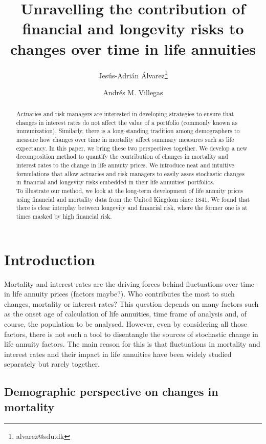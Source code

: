 \documentclass[12pt]{article}
\title{Unravelling the contribution of financial and longevity risks to changes over time in life annuities}
\author[1]{Jes\'us-Adri\'an \'Alvarez\thanks{alvarez@sdu.dk}}
\author[2]{Andr\'es M. Villegas}
\affil[1]{{\small Interdisciplinary Centre on Population Dynamics, University of Southern Denmark} }
\affil[2]{\small{School of Risk and Actuarial Studies and ARC Centre of Excellence in Population Ageing Research (CEPAR)\\ UNSW Business School, Sydney, Australia}}
\begin{document}
\maketitle

{
\setcounter{tocdepth}{2}
}



\begin{abstract}
	Actuaries and risk managers are interested in developing strategies to ensure that changes in interest rates do not affect the value of a portfolio (commonly known as immunization). Similarly, there is a long-standing tradition among demographers to measure how changes over time in mortality affect summary measures such as life expectancy. In this paper, we bring these two perspectives together. We develop a new decomposition method to quantify the contribution of changes in mortality and interest rates to the change in life annuity prices. We introduce neat and intuitive formulations that allow actuaries and risk managers to easily asses stochastic changes in financial and longevity risks embedded in their life annuities' portfolios. \\
	
	To illustrate our method, we look at the long-term development of life annuity prices using financial and mortality data from the United Kingdom since 1841. We found that there is clear interplay between longevity and financial risk, where the former one is at times masked by high financial risk. 
\end{abstract}
\newpage
\section{Introduction}\label{introduction}


Mortality and interest rates are the driving forces behind fluctuations over time in life annuity prices (factors maybe?). Who contributes the most to such changes, mortality or interest rates? This question depends on many factors such as the onset age of calculation of life annuities, time frame of analysis and, of course, the population to be analysed. However, even by considering all those factors, there is not such a tool to disentangle the sources of stochastic change in life annuity factors. The main reason for this is that fluctuations in mortality and interest rates and their impact in life annuities have been widely studied separately but rarely together.



\subsection*{Demographic perspective on changes in mortality}
\end{document}
